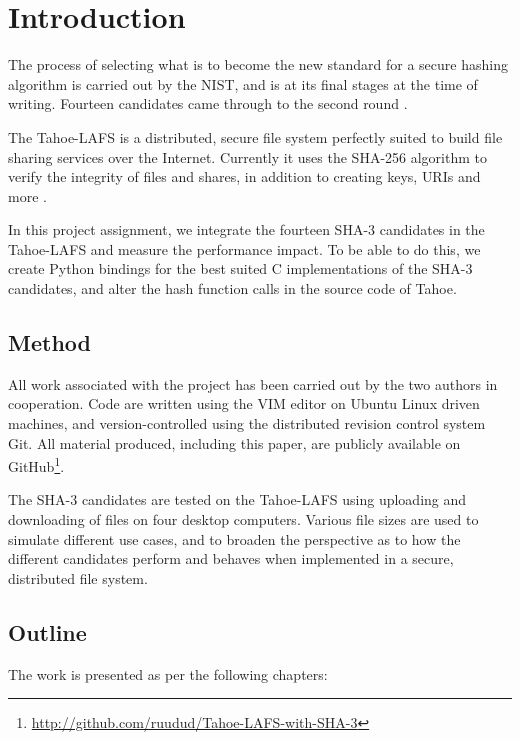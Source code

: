 \documentclass[english,12pt,a4paper]{book}
\begin{document}
\chapter{Introduction}
\setcounter{page}{1}

The process of selecting what is to become the new standard for a secure hashing
algorithm is carried out by the {NIST}, and is at its final stages at the time
of writing. Fourteen candidates came through to the second round
\cite{s_nistround2}.

The Tahoe-\ac{LAFS} is a distributed, secure file system perfectly suited to
build file sharing services over the Internet. Currently it uses the
\ac{SHA}-256 algorithm to verify the integrity of files and shares, in addition
to creating keys, \ac{URI}s and more \cite{t_tahoe}.

In this project assignment, we integrate the fourteen \ac{SHA}-3 candidates in
the Tahoe-\ac{LAFS} and measure the performance impact. To be able to do this,
we create Python bindings for the best suited C implementations of the SHA-3
candidates, and alter the hash function calls in the source code of Tahoe.

\section{Method}

All work associated with the project has been carried out by the two authors in
cooperation. Code are written using the VIM editor on Ubuntu Linux
driven machines, and version-controlled using the distributed revision control
system Git. All material produced, including this paper, are publicly available
on GitHub\footnote{\url{http://github.com/ruudud/Tahoe-LAFS-with-SHA-3}}.

The \ac{SHA}-3 candidates are tested on the Tahoe-\ac{LAFS} using uploading and
downloading of files on four desktop computers. Various file sizes are used to
simulate different use cases, and to broaden the perspective as to how the
different candidates perform and behaves when implemented in a secure,
distributed file system.

\section{Outline}

The work is presented as per the following chapters:
\end{document}
